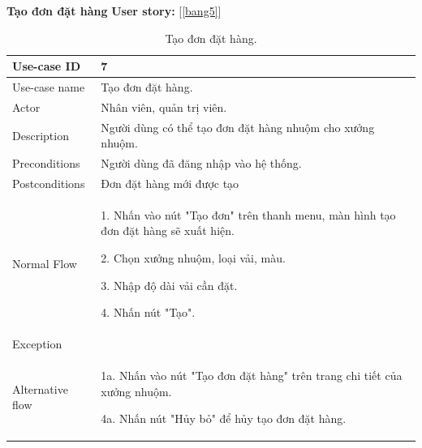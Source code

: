 \newpage
\textbf{Tạo đơn đặt hàng}
\textbf{User story:} [\ref{bang5}]
\begin{table}[!htp]
    \centering
    \begin{tabular}{|m{3cm}|m{10cm}|}
    \hline 
        Use-case ID & 7\\ \hline
        Use-case name & Tạo đơn đặt hàng.\\ \hline
        Actor & Nhân viên, quản trị viên.\\ \hline
        Description & Người dùng có thể tạo đơn đặt hàng nhuộm cho xưởng nhuộm.\\ \hline
        Preconditions & Người dùng đã đăng nhập vào hệ thống.\\ \hline
        Postconditions & Đơn đặt hàng mới được tạo\\ \hline
        Normal Flow & 
        1. Nhấn vào nút "Tạo đơn" trên thanh menu, màn hình tạo đơn đặt hàng sẽ xuất hiện.\par
        2. Chọn xưởng nhuộm, loại vải, màu.\par
        3. Nhập độ dài vải cần đặt.\par
        4. Nhấn nút "Tạo".
        \\ \hline
        Exception & \\ \hline
        Alternative flow & 
        1a. Nhấn vào nút "Tạo đơn đặt hàng" trên trang chi tiết của xưởng nhuộm.\par
        4a. Nhấn nút "Hủy bỏ" để hủy tạo đơn đặt hàng.
        \\ 
    \hline 
    \end{tabular}
    \caption{Tạo đơn đặt hàng.}
    \label{bang7}
\end{table}

